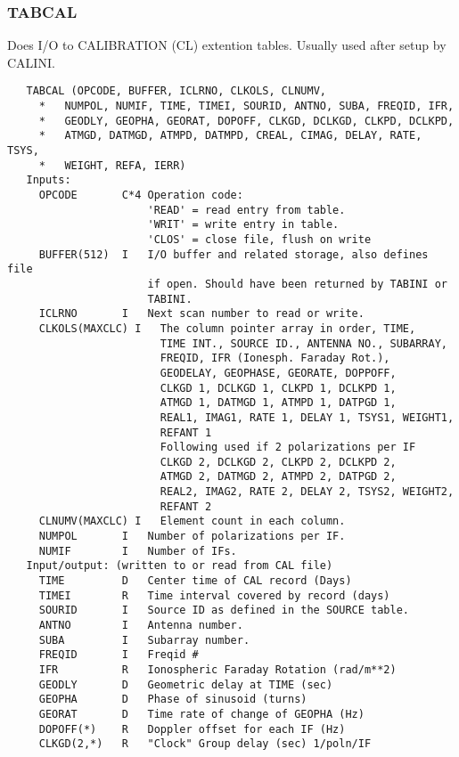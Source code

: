\subsubsection{TABCAL}
Does I/O to CALIBRATION (CL) extention tables. Usually used after setup
by CALINI.
\begin{verbatim}
   TABCAL (OPCODE, BUFFER, ICLRNO, CLKOLS, CLNUMV,
     *   NUMPOL, NUMIF, TIME, TIMEI, SOURID, ANTNO, SUBA, FREQID, IFR,
     *   GEODLY, GEOPHA, GEORAT, DOPOFF, CLKGD, DCLKGD, CLKPD, DCLKPD,
     *   ATMGD, DATMGD, ATMPD, DATMPD, CREAL, CIMAG, DELAY, RATE, TSYS,
     *   WEIGHT, REFA, IERR)
   Inputs:
     OPCODE       C*4 Operation code:
                      'READ' = read entry from table.
                      'WRIT' = write entry in table.
                      'CLOS' = close file, flush on write
     BUFFER(512)  I   I/O buffer and related storage, also defines file
                      if open. Should have been returned by TABINI or
                      TABINI.
     ICLRNO       I   Next scan number to read or write.
     CLKOLS(MAXCLC) I   The column pointer array in order, TIME,
                        TIME INT., SOURCE ID., ANTENNA NO., SUBARRAY,
                        FREQID, IFR (Ionesph. Faraday Rot.),
                        GEODELAY, GEOPHASE, GEORATE, DOPPOFF,
                        CLKGD 1, DCLKGD 1, CLKPD 1, DCLKPD 1,
                        ATMGD 1, DATMGD 1, ATMPD 1, DATPGD 1,
                        REAL1, IMAG1, RATE 1, DELAY 1, TSYS1, WEIGHT1,
                        REFANT 1
                        Following used if 2 polarizations per IF
                        CLKGD 2, DCLKGD 2, CLKPD 2, DCLKPD 2,
                        ATMGD 2, DATMGD 2, ATMPD 2, DATPGD 2,
                        REAL2, IMAG2, RATE 2, DELAY 2, TSYS2, WEIGHT2,
                        REFANT 2
     CLNUMV(MAXCLC) I   Element count in each column.
     NUMPOL       I   Number of polarizations per IF.
     NUMIF        I   Number of IFs.
   Input/output: (written to or read from CAL file)
     TIME         D   Center time of CAL record (Days)
     TIMEI        R   Time interval covered by record (days)
     SOURID       I   Source ID as defined in the SOURCE table.
     ANTNO        I   Antenna number.
     SUBA         I   Subarray number.
     FREQID       I   Freqid #
     IFR          R   Ionospheric Faraday Rotation (rad/m**2)
     GEODLY       D   Geometric delay at TIME (sec)
     GEOPHA       D   Phase of sinusoid (turns)
     GEORAT       D   Time rate of change of GEOPHA (Hz)
     DOPOFF(*)    R   Doppler offset for each IF (Hz)
     CLKGD(2,*)   R   "Clock" Group delay (sec) 1/poln/IF

\end{verbatim}
